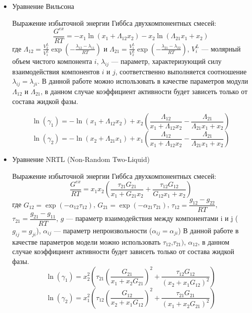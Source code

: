 \begin{itemize}
	\item Уравнение Вильсона
	
	Выражение избыточной энергии Гиббса двухкомпонентных смесей:
	\begin{equation}\label{eq.phase.wilson}
	\frac{G^{ex}}{RT}=-x_1 \ln(x_1+\Lambda_{12} x_2)-x_2 \ln(\Lambda_{21} x_1 +x_2)
	\end{equation}
	где $\Lambda_{12}=\frac{V_2^L}{V_1^L}\exp\left(-\frac{\lambda_{12}-\lambda_{11}}{RT} \right)$ и $\Lambda_{21}=\frac{V_1^L}{V_2^L}\exp\left(-\frac{\lambda_{21}-\lambda_{22}}{RT}\right)$,  $V_i^L$ --- молярный объем чистого компонента $i$, $\lambda_{ij}$ --- параметр, характеризующий силу взаимодействия компонентов $i$ и $j$, соответственно выполняется соотношение $\lambda_{ij}=\lambda_{ji}$. В данной работе можно использовать в качестве параметров модули $\Lambda_{12}$ и $\Lambda_{21}$, в данном случае коэффициент активности будет зависеть только от состава жидкой фазы.
	
	\begin{equation}
	\ln(\gamma_1)=-\ln(x_1 + \Lambda_{12} x_2) + x_2 \left( \dfrac{\Lambda_{12}}{x_1 + \Lambda_{12} x_2 } - \dfrac{\Lambda_{21}}{\Lambda_{21} x_1+x_2} \right)
	\end{equation}
	\begin{equation}
	\ln(\gamma_2)=-\ln(x_2 + \Lambda_{21} x_1) + x_1 \left( \dfrac{\Lambda_{12}}{x_1 + \Lambda_{12} x_2 } - \dfrac{\Lambda_{21}}{\Lambda_{21} x_1+x_2} \right)
	\end{equation} 
	
	\item Уравнение NRTL (Non-Random Two-Liquid)
	
	Выражение избыточной энергии Гиббса двухкомпонентных смесей:
	\begin{equation}\label{eq.phase.nrtl}
	\dfrac{G^{ex}}{RT}=x_1 x_2 \left( \dfrac{\tau_{21}G_{21}}{x_1 + G_{21} x_2} + \dfrac{\tau_{12} G_{12}}{G_{12} x_1 +x_2} \right)
	\end{equation}
	где $G_{12}=\exp(-\alpha_{12} \tau_{12})$,  $G_{21}=\exp(-\alpha_{21} \tau_{21})$, $\tau_{12}=\dfrac{g_{12}-g_{22}}{RT}$, $\tau_{21}=\dfrac{g_{21}-g_{11}}{RT}$, $g$ --- параметр взаимодействия между компонентами i и j ($g_{ij}=g_{ji}$), $\alpha_{ij}$ --- параметр непроизвольности ($\alpha_{ij}=\alpha_{ji}$)
	В данной работе в качестве параметров модели можно использовать $\tau_{12}$,$\tau_{21})$, $\alpha_{12}$, в данном случае коэффициент активности будет зависеть только от состава жидкой фазы.
	\begin{equation}
	\ln(\gamma_1)=x^2_2 \left( \tau_{21} \left(\dfrac{G_{21}}{x_1+x_2 G_{21}}\right)^2 + \dfrac{\tau_{12} G_{12}}{(x_2+x_1 G_{12})^2} \right)
	\end{equation}
	\begin{equation}
	\ln(\gamma_2)=x^2_1 \left( \tau_{12} \left(\dfrac{G_{12}}{x_2+x_1 G_{12}}\right)^2 + \dfrac{\tau_{21} G_{21}}{(x_1+x_2 G_{21})^2} \right)
	\end{equation} 
\end{itemize}

